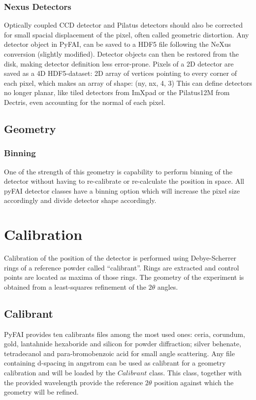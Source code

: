 \documentclass[preprint]{iucr}
\begin{document}
\subsubsection{Nexus Detectors}
Optically coupled CCD detector and Pilatus detectors should also be corrected
for small spacial displacement of the pixel, often called geometric distortion.
Any detector object in PyFAI, can be saved to a HDF5 file
following the NeXus conversion (slightly modified).
Detector objects can then be restored from the disk, making detector definition
less error-prone.
Pixels of a 2D detector are saved as a 4D HDF5-dataset: 2D array of vertices
pointing to every corner of each pixel, which makes an array of shape: (ny, nx, 4, 3)
This can define detectors no longer planar, like tiled detectors from
ImXpad or the Pilatus12M from Dectris, even accounting for the normal of each
pixel.

\subsection{Geometry}

\subsubsection{Binning}
One of the strength of this geometry is capability to perform binning of the
detector without having to re-calibrate or re-calculate the position in space.
All pyFAI detector classes have a binning option which will increase the pixel
size accordingly and divide detector shape accordingly.

\section{Calibration}
Calibration of the position of the detector is performed using Debye-Scherrer
rings of a reference powder called ``calibrant''.
Rings are extracted and control points are located as maxima of those rings.
The geometry of the experiment is obtained from a least-squares refinement of
the $2\theta$ angles.
\subsection{Calibrant}
PyFAI provides ten calibrants files among the most used ones: ceria, corundum,
gold, lantahnide hexaboride and silicon for powder diffraction; silver behenate,
tetradecanol and para-bromobenzoic acid for small angle scattering.
Any file containing d-spacing in angstrom can be used as calibrant for a
geometry calibration and will be loaded by the $Calibrant$ class.
This class,
together with the provided wavelength provide the reference $2\theta$ position
against which the geometry will be refined.
\end{document}

